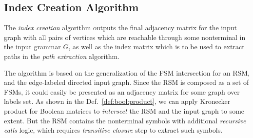 \subsection{Index Creation Algorithm}

The \textit{index creation} algorithm outputs the final adjacency matrix for the input graph with all pairs of vertices which are reachable through some nonterminal in the input grammar $G$, as well as the index matrix which is to be used to extract paths in the \textit{path extraction} algorithm.

The algorithm is based on the generalization of the FSM intersection for an RSM,  and the edge-labeled directed input graph.
Since the RSM is composed as a set of FSMs, it could easily be presented as an adjacency matrix for some graph over labels set.
As shown in the Def.~\ref{def:bool:product}, we can apply Kronecker product for Boolean matrices to \textit{intersect} the RSM and the input graph to some extent.
But the RSM contains the nonterminal symbols with additional \textit{recursive calls} logic, which requires \textit{transitive closure} step to extract such symbols.

